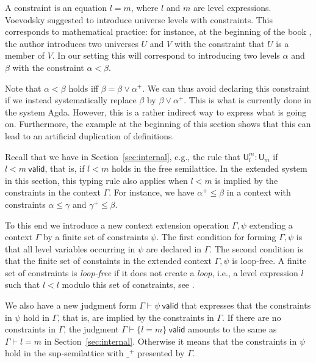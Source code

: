 \documentclass[11pt,a4paper]{article}
\theoremstyle{definition}
\newcommand{\UU}{\mathsf{U}}
\newcommand{\valid}{\mathsf{valid}}
\newcommand{\set}[1]{\{#1\}}
\begin{document}
A constraint is an equation $l = m$, where $l$ and $m$ are level expressions.
Voevodsky \cite{VV} suggested to introduce universe levels with
constraints. This corresponds to mathematical practice:
for instance, at the beginning of the book \cite{giraud:cohom-non-abel},
the author introduces two universes $U$ and $V$ with the constraint
that $U$ is a member of $V$.
In our setting this will correspond to introducing two levels
$\alpha$ and $\beta$ with the constraint $\alpha<\beta$.

Note that $\alpha < \beta$ holds iff $\beta = \beta \vee\alpha^+$.
We can thus avoid declaring this constraint if we instead
systematically replace $\beta$ by $\beta\vee\alpha^+$.
This is what is currently done in the system Agda.
However, this is a rather indirect way to express what is
going on. Furthermore, the example at the beginning of this section
shows that this can lead to an artificial duplication of definitions.

Recall that we have in Section~\ref{sec:internal}, e.g., the rule
that $\UU^m_l:\UU_m$ if $l<m~\valid$, that is, if
$l<m$ holds in the free semilattice. %
In the extended system in this section, this typing rule also applies
when $l<m$ is implied by the constraints in the context $\Gamma$.
For instance, we have $\alpha^+\leqslant\beta$ in a context
with constraints $\alpha\leqslant\gamma$ and $\gamma^+\leqslant\beta$.

To this end we introduce a new context extension operation $\Gamma,\psi$
extending a context $\Gamma$ by a finite set of constraints $\psi$.
The first condition for forming $\Gamma,\psi$ is that all level variables
occurring in $\psi$ are declared in $\Gamma$. The second condition
is that the finite set of constaints in the extended context
$\Gamma,\psi$ is loop-free.
A finite set of constraints is {\em loop-free} if it does not
create a {\em loop}, i.e., a level expression $l$ such that $l<l$
modulo this set of constraints, see \cite{bezem-coquand:lattices}.


We also have a new judgment form $\Gamma\vdash\psi~\valid$ that expresses
that the constraints in $\psi$ hold in $\Gamma$, that is,
are implied by the constraints in $\Gamma$. If there are
no constraints in $\Gamma$, the judgment $\Gamma\vdash\set{l=m}~\valid$
amounts to the same as $\Gamma\vdash l=m$ in Section~\ref{sec:internal}.
Otherwise it means that the constraints in $\psi$ hold in the
sup-semilattice with $\_^+$ presented by $\Gamma$.
\end{document}
